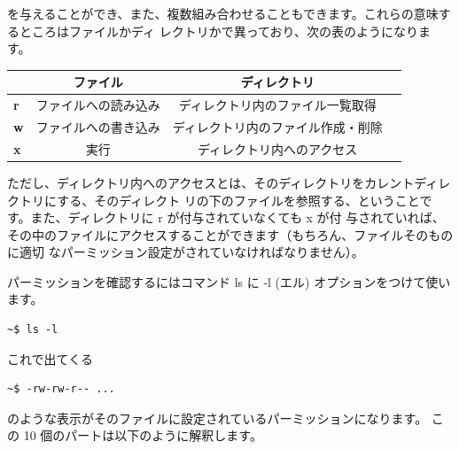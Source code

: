 \documentclass[a4j]{ltjreport}
\begin{document}
    を与えることができ、また、複数組み合わせることもできます。これらの意味するところはファイルかディ
    レクトリかで異っており、次の表のようになります。

    \begin{table}[htb]
        \centering
          \begin{tabular}{|l|c|c|c|}  \hline
              & ファイル & ディレクトリ  \\ \hline 
            \textbf{r} & ファイルへの読み込み & ディレクトリ内のファイル一覧取得 \\ \hline
            \textbf{w} & ファイルへの書き込み & ディレクトリ内のファイル作成・削除  \\ \hline
            \textbf{x} & 実行 & ディレクトリ内へのアクセス \\ \hline
          \end{tabular}
    \end{table}

    ただし、ディレクトリ内へのアクセスとは、そのディレクトリをカレントディレクトリにする、そのディレクト
    リの下のファイルを参照する、ということです。また、ディレクトリに r が付与されていなくても x が付
    与されていれば、その中のファイルにアクセスすることができます（もちろん、ファイルそのものに適切
    なパーミッション設定がされていなければなりません）。

    パーミッションを確認するにはコマンド ls に -l (エル) オプションをつけて使います。

    \vspace*{1mm}
    \begin{lstlisting}[numbers=none]
        ~$ ls -l
    \end{lstlisting}
    \vspace*{1mm}

    これで出てくる

    \vspace*{1mm}
    \begin{lstlisting}[numbers=none]
        ~$ -rw-rw-r-- ...
    \end{lstlisting}
    \vspace*{1mm}

    のような表示がそのファイルに設定されているパーミッションになります。
    この 10 個のパートは以下のように解釈します。
\end{document}
